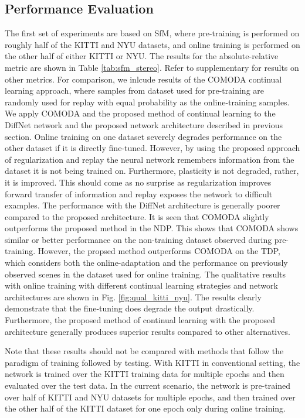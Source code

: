 \documentclass[lettersize,journal]{IEEEtran}
\begin{document}
 \subsection{Performance Evaluation}
 \noindent The first set of experiments are based on SfM, where pre-training is performed on roughly half of the KITTI and NYU datasets, and online training is performed on the other half of either KITTI or NYU. The results for the absolute-relative metric are shown in Table \ref{tab:sfm_stereo}. Refer to supplementary for results on other metrics. For comparison, we inlcude results of the COMODA \cite{kuznietsov2021comoda} continual learning approach, where samples from dataset used for pre-training are randomly used for replay with equal probability as the online-training samples. We apply COMODA and the proposed method of continual learning to the DiffNet \cite{zhou2021self} network and the proposed network architecture described in previous section. Online training on one dataset severely degrades performance on the other dataset if it is directly fine-tuned. However, by using the proposed approach of regularization and replay the neural network remembers information from the dataset it is not being trained on. Furthermore, plasticity is not degraded, rather, it is improved. This should come as no surprise as regularization improves forward transfer of information and replay exposes the network to difficult examples. The performance with the DiffNet architecture is generally poorer compared to the proposed architecture. It is seen that COMODA slightly outperforms the proposed method in the NDP. This shows that COMODA shows similar or better performance on the non-training dataset observed during pre-training. However, the propsed method outperforms COMODA on the TDP, which considers both the online-adaptation and the performance on previously observed scenes in the dataset used for online training. The qualitative results with online training with different continual learning strategies and network architectures are shown in Fig. \ref{fig:qual_kitti_nyu}. The results clearly demonstrate that the fine-tuning does degrade the output drastically. Furthermore, the proposed method of continual learning with the proposed architecture generally produces superior results compared to other alternatives.
 
 Note that these results should not be compared with methods that follow the paradigm of training followed by testing. With KITTI in conventional setting, the network is trained over the KITTI training data for multiple epochs and then evaluated over the test data. In the current scenario, the network is pre-trained over half of KITTI and NYU datasets for multiple epochs, and then trained over the other half of the KITTI dataset for one epoch only during online training. 
 
\end{document}
